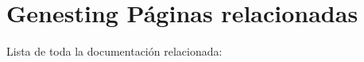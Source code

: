 \section{Genesting P\'{a}ginas relacionadas}
Lista de toda la documentaci\'{o}n relacionada:\begin{CompactList}
\item {}

\item {}

\end{CompactList}
